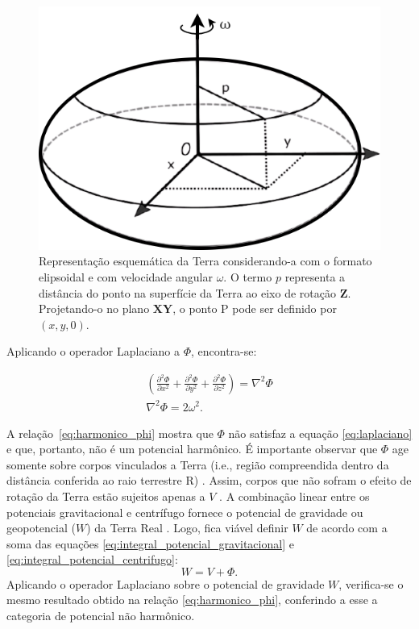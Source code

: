 \begin{figure}[!h]
	\centering
	\includegraphics[scale=0.4]{figs/a.png}
	\caption{Representação esquemática da Terra considerando-a com o formato elipsoidal e com velocidade angular $\omega$. O termo $p$ representa a distância do ponto na superfície da Terra ao eixo de rotação $\mathbf{Z}$. Projetando-o no plano $\mathbf{XY}$, o ponto P pode ser definido por $(x,y,0)$.}
	\label{fig:força_centrifuga}
\end{figure} Aplicando o operador Laplaciano a $\Phi$, encontra-se:

\begin{equation} \label{eq:harmonico_phi}
\begin{gathered}
\displaystyle {\left( \frac{\partial^{2} \Phi}{\partial x^{2}}+\frac{\partial^{2} \Phi}{\partial y^{2}}+\frac{\partial^{2} \Phi}{\partial z^{2}}\right) = \nabla^{2}\Phi} \\
\displaystyle {\nabla^{2}\Phi = 2\omega^{2}}.
\end{gathered}
\end{equation}

A relação~\ref{eq:harmonico_phi} mostra que $\Phi$ não satisfaz a equação \ref{eq:laplaciano} e que, portanto, não é um potencial harmônico. É importante observar que $\Phi$ age somente sobre corpos vinculados a Terra (i.e., região compreendida dentro da distância conferida ao raio terrestre R) \cite{escobar2000}. Assim, corpos que não sofram o efeito de rotação da Terra estão sujeitos apenas a $V$ \cite{torge}. A combinação linear entre os potenciais gravitacional e centrífugo fornece o potencial de gravidade ou geopotencial ($W$) da Terra Real \cite{hofmann2005}. Logo, fica viável definir $W$ de acordo com a soma das equações \ref{eq:integral_potencial_gravitacional} e \ref{eq:integral_potencial_centrifugo}:
\begin{equation} \label{eq:integral_potencial_W}
\displaystyle{W = V + \Phi }.
\end{equation} Aplicando o operador Laplaciano sobre o potencial de gravidade $W$, verifica-se o mesmo resultado obtido na relação \ref{eq:harmonico_phi}, conferindo a esse a categoria de potencial não harmônico.

